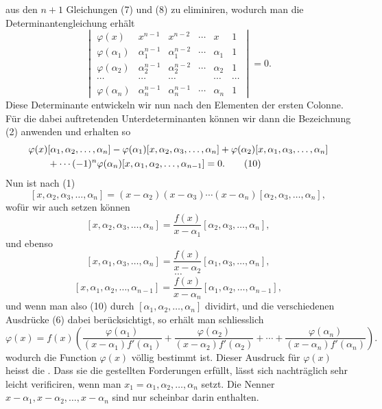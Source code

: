 
aus den $n+1$ Gleichungen (7) und (8) zu eliminiren, wodurch man die Determinantengleichung erhält
\[
\begin{vmatrix}
 \varphi(x)&x^{n-1}&x^{n-2}&\cdots&x&1\\
 \varphi(\alpha_1)&\alpha_1^{n-1}&\alpha_1^{n-2}&\cdots&\alpha_1&1\\
 \varphi(\alpha_2)&\alpha_2^{n-1}&\alpha_2^{n-2}&\cdots&\alpha_2&1\\
 \cdots&\cdots&\cdots&&\cdots&\cdots\\
 \varphi(\alpha_n)&\alpha_n^{n-1}&\alpha_n^{n-1}&\cdots&\alpha_n&1%
\end{vmatrix}=0.\tag{9}
\]
Diese Determinante entwickeln wir nun nach den Elementen der ersten Colonne. Für die dabei auftretenden Unterdeterminanten können wir dann die Bezeichnung (2) anwenden und erhalten so
\begin{align}
&\varphi(x)[\alpha_1,\alpha_2,\ldots,\alpha_n]
-\varphi(\alpha_1)[x,\alpha_2,\alpha_3,\ldots,\alpha_n]
+\varphi(\alpha_2)[x,\alpha_1,\alpha_3,\ldots,\alpha_n]
\notag\\
&\qquad+\cdots(-1)^n\varphi(\alpha_n)[x,\alpha_1,\alpha_2,\ldots,\alpha_{n-1}]=0.\tag{10}
\end{align}
Nun ist nach (1)
\[
 [x,\alpha_2,\alpha_3,
 \ldots,\alpha_n]=(x-\alpha_2)(x-\alpha_3)\cdots(x-\alpha_n)[\alpha_2,\alpha_3,
 \ldots,\alpha_n],
\]
wofür wir auch setzen können
\[
 [x,\alpha_2,\alpha_3,\ldots,\alpha_n]=\frac{f(x)}{x-\alpha_1}[\alpha_2,\alpha_3,\ldots,\alpha_n],
\]
und ebenso
\[
 [x,\alpha_1,\alpha_3,\ldots,\alpha_n]=\frac{f(x)}{x-\alpha_2}[\alpha_1,\alpha_3,\ldots,\alpha_n],
\]
\[\cdots\]
\[
 [x,\alpha_1,\alpha_2,\ldots,\alpha_{n-1}]=\frac{f(x)}{x-\alpha_n}[\alpha_1,\alpha_2,\ldots,\alpha_{n-1}],
\]
und wenn man also (10) durch $[\alpha_1,\alpha_2,\ldots,\alpha_n]$ dividirt, und die verschiedenen Ausdrücke (6) dabei berücksichtigt, so erhält man schliesslich
\begin{equation}
 \varphi(x)=f(x)\left(\frac{\varphi(\alpha_1)}{(x-\alpha_1)f'(\alpha_1)}+\frac{\varphi(\alpha_2)}{(x-\alpha_2)f'(\alpha_2)}+\cdots+\frac{\varphi(\alpha_n)}{(x-\alpha_n)f'(\alpha_n)}\right).\tag{11}
\end{equation}
wodurch die Function $\varphi(x)$ völlig bestimmt ist. Dieser Ausdruck für $\varphi(x)$ heisst die . Dass sie die gestellten Forderungen erfüllt, lässt sich nachträglich sehr leicht verificiren, wenn man $x_1=\alpha_1,\alpha_2,
\ldots,\alpha_n$ setzt. Die Nenner $x-\alpha_1,x-\alpha_2,\ldots,x-\alpha_n$ sind nur scheinbar darin enthalten.%
